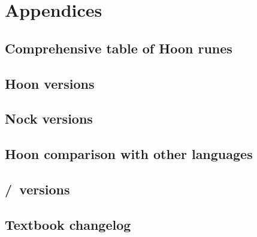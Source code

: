 \setchapterpreamble[u]{\margintoc}
\chapter{Appendices}


\section{Comprehensive table of Hoon runes}

\section{Hoon versions}

\section{Nock versions}

\section{Hoon comparison with other languages}

\section{\zuse/\lull~versions}

\section{Textbook changelog}
